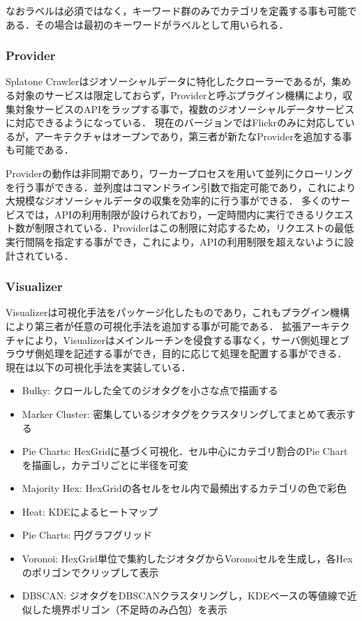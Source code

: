 なおラベルは必須ではなく，キーワード群のみでカテゴリを定義する事も可能である．その場合は最初のキーワードがラベルとして用いられる．

\subsubsection{Provider}

Splatone Crawlerはジオソーシャルデータに特化したクローラーであるが，集める対象のサービスは限定しておらず，Providerと呼ぶプラグイン機構により，収集対象サービスのAPIをラップする事で，複数のジオソーシャルデータサービスに対応できるようになっている．
現在のバージョンではFlickrのみに対応しているが，アーキテクチャはオープンであり，第三者が新たなProviderを追加する事も可能である．

Providerの動作は非同期であり，ワーカープロセスを用いて並列にクローリングを行う事ができる．並列度はコマンドライン引数で指定可能であり，これにより大規模なジオソーシャルデータの収集を効率的に行う事ができる．
多くのサービスでは，APIの利用制限が設けられており，一定時間内に実行できるリクエスト数が制限されている．Providerはこの制限に対応するため，リクエストの最低実行間隔を指定する事ができ，これにより，APIの利用制限を超えないように設計されている．
\subsubsection{Visualizer}

Visualizerは可視化手法をパッケージ化したものであり，これもプラグイン機構により第三者が任意の可視化手法を追加する事が可能である．
拡張アーキテクチャにより，Visualizerはメインルーチンを侵食する事なく，サーバ側処理とブラウザ側処理を記述する事ができ，目的に応じて処理を配置する事ができる．
現在は以下の可視化手法を実装している．
\begin{itemize}
    \item Bulky: クロールした全てのジオタグを小さな点で描画する
    \item Marker Cluster: 密集しているジオタグをクラスタリングしてまとめて表示する
    \item Pie Charts: HexGridに基づく可視化．セル中心にカテゴリ割合のPie Chartを描画し，カテゴリごとに半径を可変
    \item Majority Hex: HexGridの各セルをセル内で最頻出するカテゴリの色で彩色
    \item Heat: KDEによるヒートマップ
    \item Pie Charts: 円グラフグリッド
    \item Voronoi: HexGrid単位で集約したジオタグからVoronoiセルを生成し，各Hexのポリゴンでクリップして表示
    \item DBSCAN: ジオタグをDBSCANクラスタリングし，KDEベースの等値線で近似した境界ポリゴン（不足時のみ凸包）を表示
\end{itemize}

